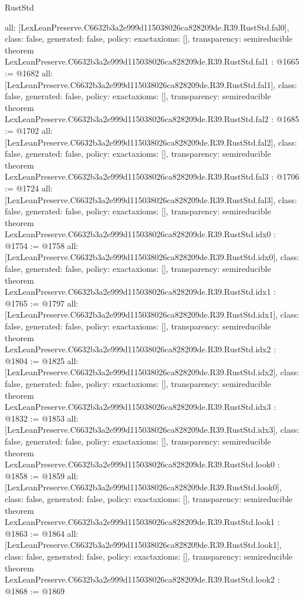 \begin{lexlean}{RustStd}
\begin{coremodule}
{  all: [LexLeanPreserve.C6632b3a2e999d115038026ca828209de.R39.RustStd.fal0],
  class: false,
  generated: false,
  policy: exact{axioms: []},
  transparency: semireducible
}
theorem LexLeanPreserve.C6632b3a2e999d115038026ca828209de.R39.RustStd.fal1 : @1665 := @1682 {
  all: [LexLeanPreserve.C6632b3a2e999d115038026ca828209de.R39.RustStd.fal1],
  class: false,
  generated: false,
  policy: exact{axioms: []},
  transparency: semireducible
}
theorem LexLeanPreserve.C6632b3a2e999d115038026ca828209de.R39.RustStd.fal2 : @1685 := @1702 {
  all: [LexLeanPreserve.C6632b3a2e999d115038026ca828209de.R39.RustStd.fal2],
  class: false,
  generated: false,
  policy: exact{axioms: []},
  transparency: semireducible
}
theorem LexLeanPreserve.C6632b3a2e999d115038026ca828209de.R39.RustStd.fal3 : @1706 := @1724 {
  all: [LexLeanPreserve.C6632b3a2e999d115038026ca828209de.R39.RustStd.fal3],
  class: false,
  generated: false,
  policy: exact{axioms: []},
  transparency: semireducible
}
theorem LexLeanPreserve.C6632b3a2e999d115038026ca828209de.R39.RustStd.idx0 : @1754 := @1758 {
  all: [LexLeanPreserve.C6632b3a2e999d115038026ca828209de.R39.RustStd.idx0],
  class: false,
  generated: false,
  policy: exact{axioms: []},
  transparency: semireducible
}
theorem LexLeanPreserve.C6632b3a2e999d115038026ca828209de.R39.RustStd.idx1 : @1765 := @1797 {
  all: [LexLeanPreserve.C6632b3a2e999d115038026ca828209de.R39.RustStd.idx1],
  class: false,
  generated: false,
  policy: exact{axioms: []},
  transparency: semireducible
}
theorem LexLeanPreserve.C6632b3a2e999d115038026ca828209de.R39.RustStd.idx2 : @1804 := @1825 {
  all: [LexLeanPreserve.C6632b3a2e999d115038026ca828209de.R39.RustStd.idx2],
  class: false,
  generated: false,
  policy: exact{axioms: []},
  transparency: semireducible
}
theorem LexLeanPreserve.C6632b3a2e999d115038026ca828209de.R39.RustStd.idx3 : @1832 := @1853 {
  all: [LexLeanPreserve.C6632b3a2e999d115038026ca828209de.R39.RustStd.idx3],
  class: false,
  generated: false,
  policy: exact{axioms: []},
  transparency: semireducible
}
theorem LexLeanPreserve.C6632b3a2e999d115038026ca828209de.R39.RustStd.look0 : @1858 := @1859 {
  all: [LexLeanPreserve.C6632b3a2e999d115038026ca828209de.R39.RustStd.look0],
  class: false,
  generated: false,
  policy: exact{axioms: []},
  transparency: semireducible
}
theorem LexLeanPreserve.C6632b3a2e999d115038026ca828209de.R39.RustStd.look1 : @1863 := @1864 {
  all: [LexLeanPreserve.C6632b3a2e999d115038026ca828209de.R39.RustStd.look1],
  class: false,
  generated: false,
  policy: exact{axioms: []},
  transparency: semireducible
}
theorem LexLeanPreserve.C6632b3a2e999d115038026ca828209de.R39.RustStd.look2 : @1868 := @1869 {
}
\end{coremodule}
\end{lexlean}
